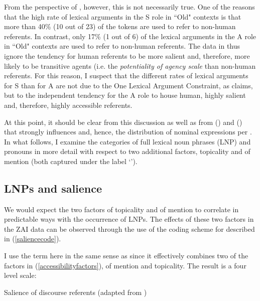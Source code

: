 From the perspective of , however, this is not necessarily true. One of the reasons that the high rate of lexical arguments in the S role in ``Old" contexts is that more than 40{\%} (10 out of 23) of the tokens are used to refer to non-human referents. In contrast, only 17{\%} (1 out of 6) of the lexical arguments in the A role in ``Old" contexts are used to refer to non-human referents. The data in  thus ignore the tendency for human referents to be more salient and, therefore, more likely to be transitive agents (i.e. the \textit{potentiality of agency scale} \citet{silverstein1976} than non-human referents. For this reason, I suspect that the different rates of lexical arguments for S than for A are not due to the One Lexical Argument Constraint, as \citet{arnold2003} claims, but to the independent tendency for the A role to house human, highly salient and, therefore, highly accessible referents.


At this point, it should be clear from this discussion as well as from  () and  () that  strongly influences  and, hence, the distribution of nominal expressions per . In what follows, I examine the categories of full lexical noun phrases (LNP) and pronouns in more detail with respect to two additional  factors, topicality and  of mention (both captured under the label `').


\subsection{LNPs and salience}\label{coding}

We would expect the two  factors of topicality and  of mention to correlate in predictable ways with the occurrence of LNPs. The effects of these two factors in the ZAI data can be observed through the use of the coding scheme for  described in (\ref{saliencecode}). 

I use the term  here in the same sense as \citet{arnold2003} since it effectively combines two of the factors in (\ref{accessibilityfactors}),  of mention and topicality. The result is a four level scale:


\ea\label{saliencecode}  Salience of discourse referents (adapted from \citealt[231]{arnold2003})

